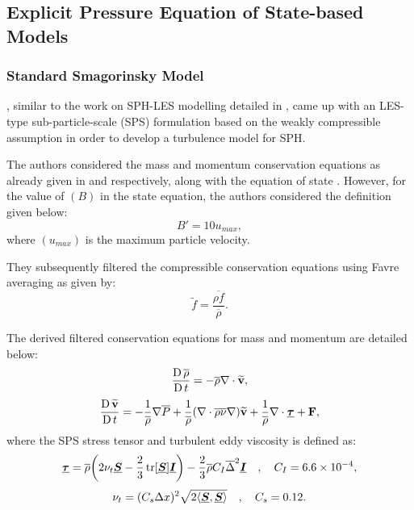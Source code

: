 \subsection{Explicit Pressure Equation of State-based Models}
\subsubsection{Standard Smagorinsky Model}

\cite{ROGERS2005}, similar to the work on SPH-LES modelling detailed in , came up with an LES-type sub-particle-scale (SPS) formulation based on the weakly compressible assumption in order to develop a turbulence model for SPH.

The authors considered the mass and momentum conservation equations as already given in  and   respectively, along with the equation of state . However, for the value of $(B)$ in the state equation, the authors considered the definition given below:
\begin{equation}
    B' = 10 u_{max},
    \label{eq:ROGERS2005-eos-b}
\end{equation}
where $(u_{max})$ is the maximum particle velocity.

They subsequently filtered the compressible conservation equations using Favre averaging as given by:
\begin{equation}
    \widetilde{f} = \frac{\overline{\rho f}}{\overline{\rho}}.
    \label{eq:ROGERS2005-favre-averaging}
\end{equation}


The derived filtered conservation equations for mass and momentum are detailed below:
\begin{equation}
    \frac{\operatorname{D} \overline{\rho}}{\operatorname{D} t} = -\overline{\rho} \nabla \cdot \mathbf{\widetilde{v}},
    \label{eq:ROGERS2005-continuity-filtered}
\end{equation}
\begin{equation}
    \frac{\operatorname{D} \mathbf{\widetilde{v}}}{\operatorname{D} t} = - \frac{1}{\overline{\rho}}\nabla \overline{P} + \frac{1}{\overline{\rho}} (\nabla \cdot \overline{\rho \nu} \nabla) \mathbf{\widetilde{v}} + \frac{1}{\overline{\rho}}\nabla\cdot\underline{\bm{\tau}} + \mathbf{F},
    \label{eq:ROGERS2005-mom-filtered}
\end{equation}
where the SPS stress tensor and turbulent eddy viscosity is defined as:
\begin{equation}
    \underline{\bm{\tau}} = \overline{\rho}\bigg(2\nu_t \underline{\bm{S}} - \frac{2}{3}\operatorname{tr}[\underline{\bm{S}}]\underline{\bm{I}}\bigg) - \frac{2}{3}\overline{\rho}C_I \overline{\Delta}^2 \underline{\bm{I}} \quad , \quad C_I = 6.6 \times {10}^{-4},
    \label{eq:ROGERS2005-tau}
\end{equation}
\begin{equation}
    \nu_t = (C_s \Delta x)^2 \sqrt{2 \langle \underline{\bm{S}}, \underline{\bm{S}} \rangle} \quad , \quad C_s = 0.12.
    \label{eq:ROGERS2005-turbulent-eddy-visc}
\end{equation}


